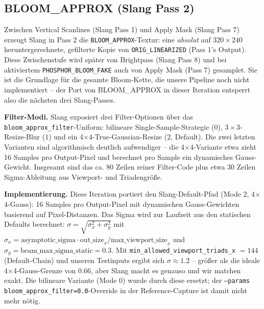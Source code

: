 \documentclass[11pt, a4paper]{article}
\begin{document}
\vspace{.5cm}
\subsection{BLOOM\_APPROX (Slang Pass 2)}
\vspace{.5cm}
Zwischen Vertical Scanlines (Slang Pass 1) und Apply Mask (Slang Pass 7) erzeugt Slang in Pass 2 die \texttt{BLOOM\_APPROX}-Textur: eine \emph{absolut} auf $320\times240$ heruntergerechnete, gefilterte Kopie von \texttt{ORIG\_LINEARIZED} (Pass 1's Output). Diese Zwischenstufe wird sp\"ater von Brightpass (Slang Pass 8) und bei aktiviertem \texttt{PHOSPHOR\_BLOOM\_FAKE} auch von Apply Mask (Pass 7) gesamplet. Sie ist die Grundlage f\"ur die gesamte Bloom-Kette, die unsere Pipeline noch nicht implementiert -- der Port von BLOOM\_APPROX in dieser Iteration entsperrt also die n\"achsten drei Slang-Passes.

\vspace{.5cm}
\textbf{Filter-Modi.} Slang exposiert drei Filter-Optionen \"uber das \texttt{bloom\_approx\_filter}-Uniform: bilineare Single-Sample-Strategie ($0$), $3\times3$-Resize-Blur ($1$) und ein 4$\times$4-True-Gaussian-Resize ($2$, Default). Die zwei letzten Varianten sind algorithmisch deutlich aufwendiger -- die 4$\times$4-Variante etwa zieht 16 Samples pro Output-Pixel und berechnet pro Sample ein dynamisches Gauss-Gewicht. Insgesamt sind das ca. 80 Zeilen reiner Filter-Code plus etwa 30 Zeilen Sigma-Ableitung aus Viewport- und Triadengr\"o{\ss}e.

\vspace{.5cm}
\textbf{Implementierung.} Diese Iteration portiert den Slang-Default-Pfad (Mode $2$, 4$\times$4-Gauss): 16 Samples pro Output-Pixel mit dynamischen Gauss-Gewichten basierend auf Pixel-Distanzen. Das Sigma wird zur Laufzeit aus den statischen Defaults berechnet: $\sigma = \sqrt{\sigma_x^2 + \sigma_y^2}$ mit $\sigma_x = \mathrm{asymptotic\_sigma} \cdot \mathrm{out\_size}_x / \mathrm{max\_viewport\_size}_x$ und $\sigma_y = \mathrm{beam\_max\_sigma\_static} = 0.3$. Mit \texttt{min\_allowed\_viewport\_triads\_x} $= 144$ (Default-Chain) und unseren Testinputs ergibt sich $\sigma \approx 1.2$ -- gr\"o{\ss}er als die ideale 4$\times$4-Gauss-Grenze von $0.66$, aber Slang macht es genauso und wir matchen exakt. Die bilineare Variante (Mode $0$) wurde durch diese ersetzt; der \texttt{--params bloom\_approx\_filter=0.0}-Override in der Reference-Capture ist damit nicht mehr n\"otig.
\end{document}
